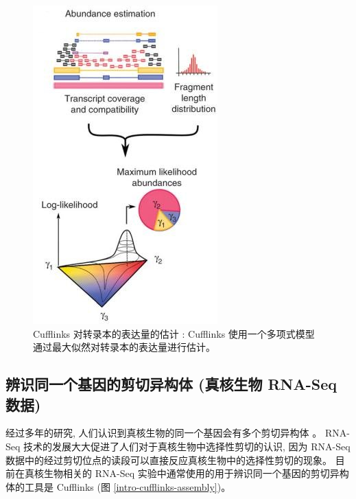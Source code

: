 \begin{figure}[!t]
\centering
\includegraphics[height=0.5\textheight]{figures/cufflinks-abundance.jpg}
\caption[Cufflinks 对转录本的表达量的估计 \cite{cufflinks.2010}]
{Cufflinks 对转录本的表达量的估计 \cite{cufflinks.2010}: 
Cufflinks 使用一个多项式模型通过最大似然对转录本的表达量进行估计。}
\label{intro-cufflinks-abundance}
\end{figure}

\subsection{辨识同一个基因的剪切异构体 (真核生物 RNA-Seq 数据)}
经过多年的研究, 人们认识到真核生物的同一个基因会有多个剪切异构体 
\cite{gilbert1978genes, rosenfeld1982calcitonin, early1980two, 
citeulike:447573, modrek2002genomic}。 
RNA-Seq 技术的发展大大促进了人们对于真核生物中选择性剪切的认识, 
因为 RNA-Seq 数据中的经过剪切位点的读段可以直接反应真核生物中的选择性剪切的现象。 
目前在真核生物相关的 RNA-Seq 实验中通常使用的用于辨识同一个基因的剪切异构体的工具是 
Cufflinks \cite{cufflinks.2010} (图 \ref{intro-cufflinks-assembly})。

